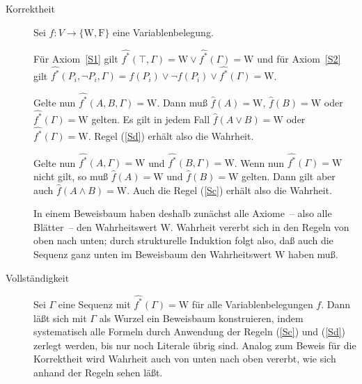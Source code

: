 \begin{beweis}
  \begin{description}
  \item[Korrektheit] Sei $f : V\rightarrow \{ \mathrm{W}, \mathrm{F}\}$ eine
    Variablenbelegung.  

    Für Axiom~\ref{S1} gilt 
    $\widehat{\mbox{$f$}^*}(\top,\Gamma)=\mathrm{W}\vee\widehat{\mbox{$f$}^*}(\Gamma)=\mathrm{W}$ und für Axiom~\ref{S2} gilt $\widehat{\mbox{$f$}^*}(P_i,\neg P_i,\Gamma)=f(P_i)\vee\neg f(P_i)\vee\widehat{\mbox{$f$}^*}(\Gamma)=\mathrm{W}$.
    
    Gelte nun $\widehat{\mbox{$f$}^*}(A, B, \Gamma)=\mathrm{W}$.  Dann muß ${\hat{f}}(A)=\mathrm{W}$,
    ${\hat{f}}(B)=\mathrm{W}$ oder
    $\widehat{\mbox{$f$}^*}(\Gamma)=\mathrm{W}$ gelten.
    Es gilt in jedem Fall
    ${\hat{f}}(A\vee B)=\mathrm{W}$ oder $\widehat{\mbox{$f$}^*}(\Gamma)=\mathrm{W}$.
    Regel (\ref{Sd}) erhält also die Wahrheit.
    
    Gelte nun $\widehat{\mbox{$f$}^*}(A, \Gamma)=\mathrm{W}$ und $\widehat{\mbox{$f$}^*}(B, \Gamma)=\mathrm{W}$.
    Wenn nun $\widehat{\mbox{$f$}^*}(\Gamma)=\mathrm{W}$ nicht gilt, so muß ${\hat{f}}(A)=\mathrm{W}$ und
    ${\hat{f}}(B)=\mathrm{W}$ gelten.  Dann gilt aber auch ${\hat{f}}(A\wedge B)=\mathrm{W}$.
    Auch die Regel (\ref{Sc}) erhält also die Wahrheit.
    
    In einem Beweisbaum haben deshalb zunächst alle Axiome~-- also alle
    Blätter~-- den Wahrheitswert $\mathrm{W}$.  Wahrheit vererbt sich in den Regeln
    von oben nach unten; durch strukturelle Induktion folgt also, daß auch
    die Sequenz ganz unten im Beweisbaum den Wahrheitswert $\mathrm{W}$ haben muß.
  \item[Vollständigkeit] Sei $\Gamma$ eine Sequenz mit
    $\widehat{\mbox{$f$}^*}(\Gamma)=\mathrm{W}$ für alle Variablenbelegungen $f$.
    Dann läßt sich mit $\Gamma$ als Wurzel ein 
    Beweisbaum konstruieren, indem systematisch alle Formeln durch Anwendung
    der Regeln (\ref{Sc}) und (\ref{Sd}) zerlegt werden, bis nur noch Literale
    übrig sind.
    Analog zum Beweis für die Korrektheit wird Wahrheit
    auch von unten nach oben vererbt, wie sich anhand der
    Regeln sehen läßt.
    

\end{description}
\end{beweis}
